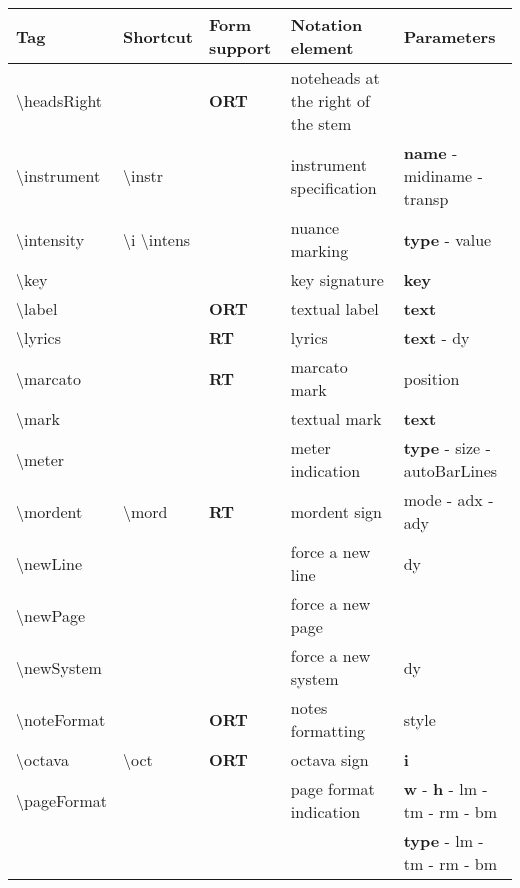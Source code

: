 \documentclass[a4paper, landscape, 10pt]{article}
\begin{document}
%
%
\begin{tabularx}{\linewidth}{p{3cm}p{4.5cm}p{3cm}p{5.5cm}l}
    \hline
    \textbf{Tag}&\textbf{Shortcut}&\textbf{Form support}&\textbf{Notation element}&\textbf{Parameters}\\
    \hline
    \textbackslash{}headsRight&&\textbf{ORT}&noteheads at the right of the stem&\\
    \hline
    \textbackslash{}instrument&\textbackslash{}instr&&instrument specification&\textbf{name} - midiname - transp\\
    \hline
    \textbackslash{}intensity&\textbackslash{}i \textbackslash{}intens&&nuance marking&\textbf{type} - value\\
    \hline
    \textbackslash{}key&&&key signature&\textbf{key}\\
    \hline
    \textbackslash{}label&&\textbf{ORT}&textual label&\textbf{text}\\
    \hline
    \textbackslash{}lyrics&&\textbf{RT}&lyrics&\textbf{text} - dy\\
    \hline
    \textbackslash{}marcato&&\textbf{RT}&marcato mark&position\\
    \hline
    \textbackslash{}mark&&&textual mark&\textbf{text}\\
    \hline
    \textbackslash{}meter&&&meter indication&\textbf{type} - size - autoBarLines\\
    \hline
    \textbackslash{}mordent&\textbackslash{}mord&\textbf{RT}&mordent sign&mode - adx - ady\\
    \hline
    \textbackslash{}newLine&&&force a new line&dy\\ %
    \hline
    \textbackslash{}newPage&&&force a new page&\\
    \hline
    \textbackslash{}newSystem&&&force a new system&dy\\ %
    \hline
    \textbackslash{}noteFormat&&\textbf{ORT}&notes formatting&style\\
    \hline
    \textbackslash{}octava&\textbackslash{}oct&\textbf{ORT}&octava sign&\textbf{i}\\ %
    \hline
    \textbackslash{}pageFormat&&&page format indication&\textbf{w} - \textbf{h} - lm - tm - rm - bm\\
    &&&&\textbf{type} - lm - tm - rm - bm\\
    \hline

\end{tabularx}
\end{document}
